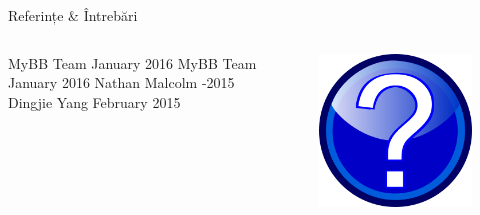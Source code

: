 \documentclass[9pt]{beamer}
\begin{document}
\begin{frame}{Referințe \& Întrebări}
  \begin{columns}
    \begin{column}[c]{0.70\textwidth}
        \begin{thebibliography}{10}    
        \beamertemplatebookbibitems
            MyBB Team
            \newblock January 2016
        \beamertemplatearticlebibitems
            MyBB Team
            \newblock January 2016
        \beamertemplatearticlebibitems
            Nathan Malcolm
            -2015
        \beamertemplatearticlebibitems
            Dingjie Yang
            \newblock February 2015
        \end{thebibliography}
    \end{column}

    \begin{column}[c]{0.30\textwidth}
      \begin{figure}
        \includegraphics[scale=0.2]{figures/question}
      \end{figure}
    \end{column}
  \end{columns}
\end{frame}
\end{document}
